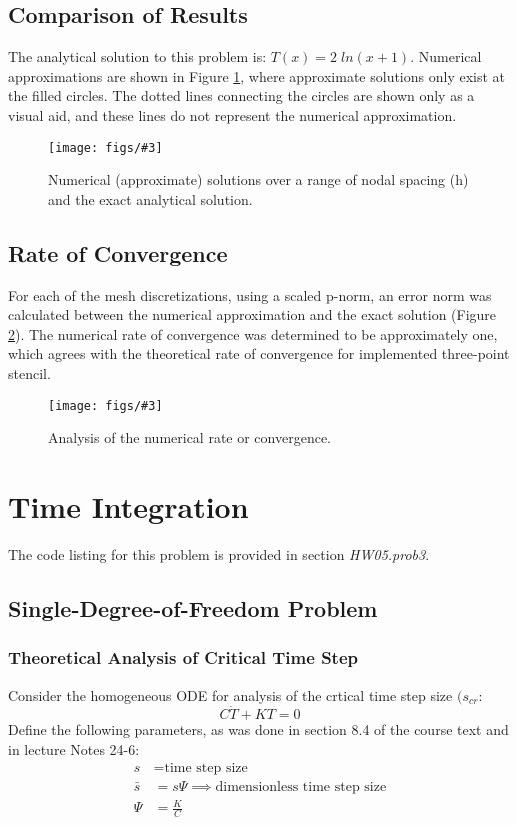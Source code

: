 \documentclass[letterpaper, 10pt, oneside]{article}
\newcommand{\be}{\begin{equation}}
\newcommand{\ee}{\end{equation}}
\newcommand{\as}[1]{\begin{align*}#1\end{align*}}
\newcommand{\Figure}[4]{
  \begin{figure}[#1]
    \centering
    \texttt{[image: figs/\#3]}
    \caption{#4.}\label{fig:#3}
  \end{figure}}
\begin{document}
\subsection{Comparison of Results}

The analytical solution to this problem is: $T(x) = 2 \;ln(x+1)$.  Numerical approximations are shown in Figure \ref{fig:2_Results.pdf}, where approximate solutions only exist at the filled circles.  The dotted lines connecting the circles are shown only as a visual aid, and these lines do not represent the numerical approximation.

\Figure{htp}{6}{2_Results.pdf}{Numerical (approximate) solutions over a range of nodal spacing (h) and the exact analytical solution}

\subsection{Rate of Convergence}
For each of the mesh discretizations, using a scaled p-norm, an error norm was calculated between the numerical approximation and the exact solution (Figure \ref{fig:2_Converg.pdf}).  The numerical rate of convergence was determined to be approximately one, which agrees with the theoretical rate of convergence for implemented three-point stencil.

\Figure{t}{6}{2_Converg.pdf}{Analysis of the numerical rate or convergence}

\section{Time Integration}
The code listing for this problem is provided in section \emph{HW05.prob3}.
\subsection{Single-Degree-of-Freedom Problem}

\subsubsection{Theoretical Analysis of Critical Time Step}
Consider the homogeneous ODE for analysis of the crtical time step size $(s_{cr}$: 
	\be C\dot{T} + KT = 0 \ee
Define the following parameters, as was done in section 8.4 of the course text and in lecture Notes 24-6:
	\as{s &= \text{time step size}\\
		\bar{s} &= s \Psi \implies \text{dimensionless time step size}\\
		\Psi &= \frac{K}{C} }
\end{document}
